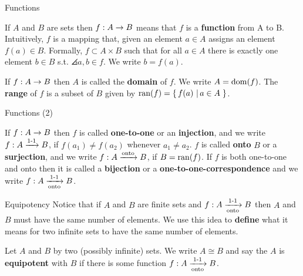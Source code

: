 \documentclass[pdf,final]{prosper}
\newcommand{\skipmed}{\vspace{2em}}
\begin{document}
\begin{slide}{Functions}

\begin{definition}
If $A$ and $B$ are sets then $f:A \rightarrow B$ means that $f$ is a \textbf{function} from A to
B. Intuitively, $f$ is a mapping that, given an element $a\in A$ assigns an
element $f(a) \in B$. Formally, $f\subset A\times B$ such that for all $a \in
A$ there is exactly one element $b \in B$ s.t. $\angles{a,b}\in f$. We write $b =
f(a)$.
\end{definition}

\skipmed

\begin{definition}
If $f:A\rightarrow B$ then $A$ is called the \textbf{domain} of $f$. We write $A=\operatorname{dom} (f)$. The
\textbf{range} of $f$ is a subset of $B$ given by $\operatorname{ran}(f)=\left\{ \, f(a) \, \left| \, a\in A \, \right.\right\}$.
\end{definition}

\skipmed

\end{slide}

\begin{slide}{Functions (2)}

\begin{definition}
If $f:A\rightarrow B$ then $f$ is called \textbf{one-to-one} or an \textbf{injection},
and we write
$f:A\xrightarrow{\text{1-1}} B$, if $f(a_1)\neq f(a_2)$ whenever $a_1\neq a_2$. $f$ is called
\textbf{onto} $B$ or a \textbf{surjection}, and we write $f:A\xrightarrow{\text{onto}} B$, if $B =
\operatorname{ran}(f)$. If $f$ is
both one-to-one and onto then it is called a \textbf{bijection} or a
\textbf{one-to-one-correspondence} and we write $f:A\xrightarrow[\text{onto}]{\text{1-1}} B$.
\end{definition}


\end{slide}

\begin{slide}{Equipotency}
Notice that if $A$ and $B$ are finite sets and $f:A \xrightarrow[\text{onto}]{\text{1-1}} B$ then $A$ and
$B$ must have the same number of elements. We use this idea to \textbf{define}
what it means for two infinite sets to have the same number of elements.

\skipmed

\begin{definition}
Let $A$ and $B$ by two (possibly infinite) sets. We write $A\cong B$ and say the
$A$ is \textbf{equipotent} with $B$ if there is some function $f:A \xrightarrow[\text{onto}]{\text{1-1}} B$.
\end{definition}
\end{slide}
\end{document}
